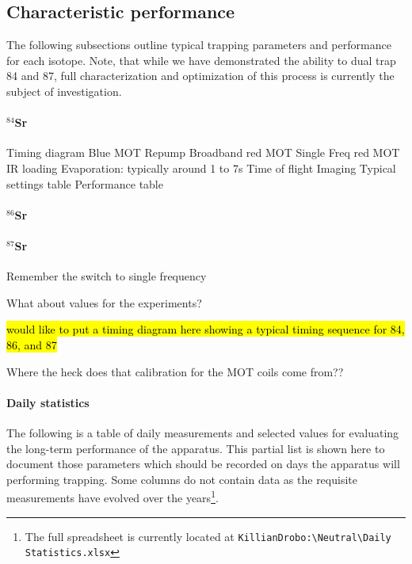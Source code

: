 \subsection{Characteristic performance} \label{sec:benchmark_trapping}

The following subsections outline typical trapping parameters and performance for each isotope. Note, that while we have demonstrated the ability to dual trap 84 and 87, full characterization and optimization of this process is currently the subject of investigation.

\paragraph{$^{84}$Sr} \label{sec:84_trapping}

Timing diagram
	Blue MOT
	Repump
	Broadband red MOT
	Single Freq red MOT
	IR loading
	Evaporation: typically around 1 to 7s
	Time of flight
	Imaging
Typical settings table
Performance table

\paragraph{$^{86}$Sr} \label{sec:86_trapping}

\paragraph{$^{87}$Sr} \label{sec:87_trapping}


Remember the switch to single frequency

What about values for the experiments?

\hl{would like to put a timing diagram here showing a typical timing sequence for 84, 86, and 87}

Where the heck does that calibration for the MOT coils come from??

\paragraph{Daily statistics} \label{sec:dailyStats}
The following is a table of daily measurements and selected values for evaluating the long-term performance of the apparatus.
This partial list is shown here to document those parameters which should be recorded on days the apparatus will performing trapping.
Some columns do not contain data as the requisite measurements have evolved over the years\footnote{The full spreadsheet is currently located at \texttt{KillianDrobo:\textbackslash Neutral\textbackslash Daily Statistics.xlsx}}.

